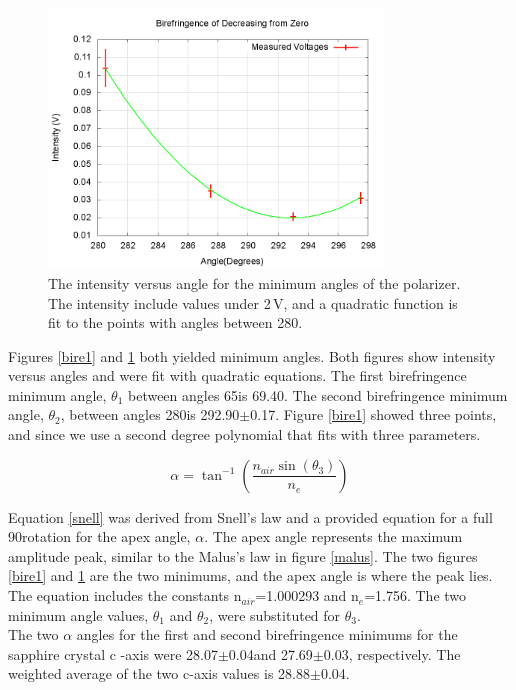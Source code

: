 \documentclass[aps,prl,twocolumn,superscriptaddress,nofootinbib]{revtex4-1}
\begin{document}
\begin{figure}[h!]
  \begin{center}
\centerline{\includegraphics[width=3.5in]{bire2.png}}
\caption{\small{The intensity versus angle for the minimum angles of the polarizer. The intensity include values under 2\,V, and a quadratic function is fit to the points with angles between 280\degree. \label{bire2}}}
  \end{center}
\end{figure}
\vspace{.7cm}

Figures \ref{bire1} and \ref{bire2} both yielded minimum angles. Both figures show intensity versus angles and were fit with quadratic equations. The first birefringence minimum angle, $\theta$$_1$ between angles 65\degree is 69.40\degree. The second birefringence minimum angle, $\theta$$_2$, between angles 280\degree is 292.90\degree$\pm$0.17\degree. Figure \ref{bire1} showed three points, and since we use a second degree polynomial that fits with three parameters.

\begin{equation}
\alpha=\tan^{-1}\left(\frac{n_{air}\sin(\theta_3)}{n_e}\right)
\label{snell}
\end{equation}

Equation \ref{snell} was derived from Snell's law and a provided equation for a full 90\degree rotation for the apex angle, $\alpha$. The apex angle represents the maximum amplitude peak, similar to the Malus's law in figure \ref{malus}. The two figures \ref{bire1} and \ref{bire2} are the two minimums, and the apex angle is where the peak lies. The equation includes the constants n$_{air}$=1.000293 and n$_e$=1.756. The two minimum angle values, $\theta$$_1$ and $\theta$$_2$, were substituted for $\theta_3$.
\\
\indent The two $\alpha$ angles for the first and second birefringence minimums for the sapphire crystal c -axis were 28.07\degree$\pm$0.04\degree and 27.69\degree$\pm$0.03\degree, respectively. The weighted average of the two c-axis values is 28.88\degree$\pm$0.04\degree.
\end{document}
